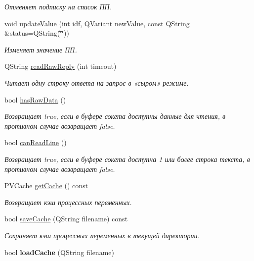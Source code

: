 \begin{DoxyCompactItemize}
\begin{DoxyCompactList}\small\item\em Отменяет подписку на список ПП. \end{DoxyCompactList}\item 
void \hyperlink{class_t2_c_manager_a82120e14de0662c77327ef1e89194aa7}{update\-Value} (int idf, Q\-Variant new\-Value, const Q\-String \&status=Q\-String(\char`\"{}\char`\"{}))
\begin{DoxyCompactList}\small\item\em Изменяет значение ПП. \end{DoxyCompactList}\item 
Q\-String \hyperlink{class_t2_c_manager_a15dd60c314af86867dafa1933970a294}{read\-Raw\-Reply} (int timeout)
\begin{DoxyCompactList}\small\item\em Читает одну строку ответа на запрос в «сыром» режиме. \end{DoxyCompactList}\item 
bool \hyperlink{class_t2_c_manager_a4bd7aafc050239fcb437eae7a5856bf3}{has\-Raw\-Data} ()
\begin{DoxyCompactList}\small\item\em Возвращает true, если в буфере сокета доступны данные для чтения, в противном случае возвращает false. \end{DoxyCompactList}\item 
bool \hyperlink{class_t2_c_manager_a4bea191e0ae504c3c84c3576262d8a4f}{can\-Read\-Line} ()
\begin{DoxyCompactList}\small\item\em Возвращает true, если в буфере сокета доступна 1 или более строка текста, в противном случае возвращает false. \end{DoxyCompactList}\item 
\hypertarget{class_t2_c_manager_aa123d8be857be61226a9c3b2a571af51}{P\-V\-Cache \hyperlink{class_t2_c_manager_aa123d8be857be61226a9c3b2a571af51}{get\-Cache} () const }\label{class_t2_c_manager_aa123d8be857be61226a9c3b2a571af51}

\begin{DoxyCompactList}\small\item\em Возвращает кэш процессных переменных. \end{DoxyCompactList}\item 
bool \hyperlink{class_t2_c_manager_a78bc4a3396048f4b30d79e2c7830b7f9}{save\-Cache} (Q\-String filename) const 
\begin{DoxyCompactList}\small\item\em Сохраняет кэш процессных переменных в текущей директории. \end{DoxyCompactList}\item 
\hypertarget{class_t2_c_manager_a584d2dbf4e16755c60223e5af38eaf78}{bool {\bfseries load\-Cache} (Q\-String filename)}\label{class_t2_c_manager_a584d2dbf4e16755c60223e5af38eaf78}


\end{DoxyCompactItemize}
